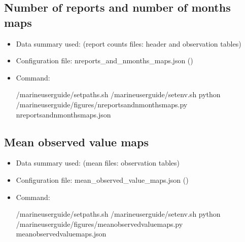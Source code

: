 \documentclass[letterpaper,10pt,english]{sphinxmanual}
\begin{document}
\subsection{Number of reports and number of months maps}
\label{\detokenize{index:number-of-reports-and-number-of-months-maps}}\begin{itemize}
\item {} 
Data summary used: {\hyperref[\detokenize{index:monthly-grids-um-section}]{}} (report counts files: header and observation tables)

\item {} 
Configuration file: nreports\_and\_nmonths\_maps.json ({\hyperref[\detokenize{index:nreports-nmonths-map}]{}})

\item {} 
Command:

\begin{sphinxVerbatim}[commandchars=\\\{\}]
 /marine\PYGZhy{}user\PYGZhy{}guide/setpaths.sh
 /marine\PYGZhy{}user\PYGZhy{}guide/setenv.sh
python /marine\PYGZhy{}user\PYGZhy{}guide/figures/nreports\PYGZus{}and\PYGZus{}nmonths\PYGZus{}maps.py nreports\PYGZus{}and\PYGZus{}nmonths\PYGZus{}maps.json
\end{sphinxVerbatim}

\end{itemize}


\subsection{Mean observed value maps}
\label{\detokenize{index:mean-observed-value-maps}}\begin{itemize}
\item {} 
Data summary used: {\hyperref[\detokenize{index:monthly-grids-um-section}]{}} (mean files: observation tables)

\item {} 
Configuration file: mean\_observed\_value\_maps.json ({\hyperref[\detokenize{index:map-mean-config}]{}})

\item {} 
Command:

\begin{sphinxVerbatim}[commandchars=\\\{\}]
 /marine\PYGZhy{}user\PYGZhy{}guide/setpaths.sh
 /marine\PYGZhy{}user\PYGZhy{}guide/setenv.sh
python /marine\PYGZhy{}user\PYGZhy{}guide/figures/mean\PYGZus{}observed\PYGZus{}value\PYGZus{}maps.py mean\PYGZus{}observed\PYGZus{}value\PYGZus{}maps.json
\end{sphinxVerbatim}

\end{itemize}
\end{document}
